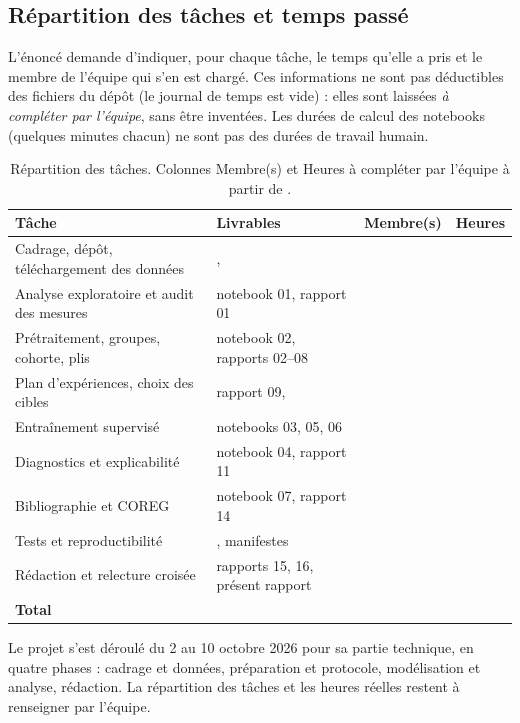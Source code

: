 \subsection{Répartition des tâches et temps passé}

L'énoncé demande d'indiquer, pour chaque tâche, le temps qu'elle a pris et le
membre de l'équipe qui s'en est chargé. Ces informations ne sont pas déductibles
des fichiers du dépôt (le journal de temps est vide) : elles sont laissées
\emph{à compléter par l'équipe}, sans être inventées. Les durées de calcul des
notebooks (quelques minutes chacun) ne sont pas des durées de travail humain.

\begin{table}[htbp]
\centering
\small
\caption{Répartition des tâches. Colonnes \og Membre(s) \fg{} et \og Heures \fg{} à
compléter par l'équipe à partir de .}
\label{tab:taches}
\begin{tabularx}{\textwidth}{@{}L l l l@{}}
\toprule
Tâche & Livrables & Membre(s) & Heures \\
\midrule
Cadrage, dépôt, téléchargement des données & ,  & \acompleter{} & \acompleter{} \\
Analyse exploratoire et audit des mesures & notebook 01, rapport 01 & \acompleter{} & \acompleter{} \\
Prétraitement, groupes, cohorte, plis & notebook 02, rapports 02--08 & \acompleter{} & \acompleter{} \\
Plan d'expériences, choix des cibles & rapport 09,  & \acompleter{} & \acompleter{} \\
Entraînement supervisé & notebooks 03, 05, 06 & \acompleter{} & \acompleter{} \\
Diagnostics et explicabilité & notebook 04, rapport 11 & \acompleter{} & \acompleter{} \\
Bibliographie et COREG & notebook 07, rapport 14 & \acompleter{} & \acompleter{} \\
Tests et reproductibilité & , manifestes & \acompleter{} & \acompleter{} \\
Rédaction et relecture croisée & rapports 15, 16, présent rapport & \acompleter{} & \acompleter{} \\
\midrule
\textbf{Total} & & & \acompleter{} \\
\bottomrule
\end{tabularx}
\end{table}

\begin{aretenir}
Le projet s'est déroulé du 2 au 10 octobre 2026 pour sa partie technique, en
quatre phases : cadrage et données, préparation et protocole, modélisation et
analyse, rédaction. La répartition des tâches et les heures réelles restent à
renseigner par l'équipe.
\end{aretenir}
